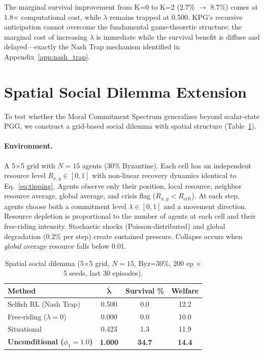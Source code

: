 \documentclass{article}
\begin{document}
\noindent The marginal survival improvement from K=0 to K=2 (2.7\% $\to$ 8.7\%) comes at 1.8$\times$ computational cost, while $\lambda$ remains trapped at 0.500.
KPG's recursive anticipation cannot overcome the fundamental game-theoretic structure: the marginal cost of increasing $\lambda$ is immediate while the survival benefit is diffuse and delayed---exactly the Nash Trap mechanism identified in Appendix~\ref{app:nash_trap}.

\section{Spatial Social Dilemma Extension}
\label{app:spatial}

To test whether the Moral Commitment Spectrum generalizes beyond scalar-state PGG, we construct a grid-based social dilemma with spatial structure (Table~\ref{tab:spatial}).

\paragraph{Environment.}
A 5$\times$5 grid with $N{=}15$ agents (30\% Byzantine).
Each cell has an independent resource level $R_{x,y} \in [0,1]$ with non-linear recovery dynamics identical to Eq.~\ref{eq:tipping}.
Agents observe only their position, local resource, neighbor resource average, global average, and crisis flag ($R_{x,y} < R_{\text{crit}}$).
At each step, agents choose both a commitment level $\lambda \in [0,1]$ and a movement direction.
Resource depletion is proportional to the number of agents at each cell and their free-riding intensity.
Stochastic shocks (Poisson-distributed) and global degradation ($0.2\%$ per step) create sustained pressure.
Collapse occurs when \emph{global} average resource falls below 0.01.

\begin{table}[h]
\centering
\caption{Spatial social dilemma (5$\times$5 grid, $N{=}15$, Byz=30\%, 200 ep $\times$ 5 seeds, last 30 episodes).}
\label{tab:spatial}
\begin{tabular}{lccc}
\toprule
\textbf{Method} & $\boldsymbol{\bar{\lambda}}$ & \textbf{Survival \%} & \textbf{Welfare} \\
\midrule
Selfish RL (Nash Trap) & 0.500 & 0.0 & 12.2 \\
Free-riding ($\lambda{=}0$) & 0.000 & 0.0 & 10.0 \\
Situational & 0.423 & 1.3 & 11.9 \\
\textbf{Unconditional ($\phi_1{=}1.0$)} & \textbf{1.000} & \textbf{34.7} & \textbf{14.4} \\
\bottomrule
\end{tabular}
\end{table}
\end{document}
